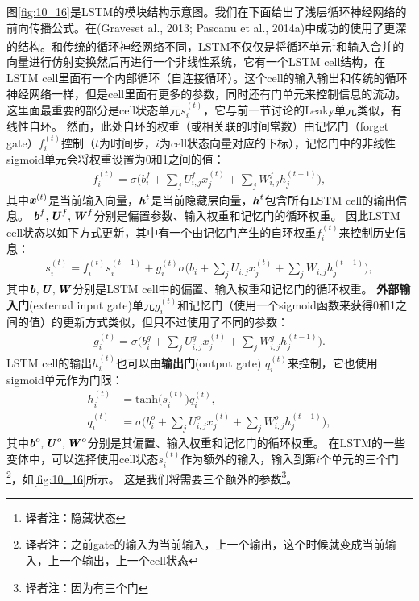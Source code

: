 图\ref{fig:10_16}是LSTM的模块结构示意图。我们在下面给出了浅层循环神经网络的前向传播公式。在(Graveset al., 2013; Pascanu et al., 2014a)中成功的使用了更深的结构。和传统的循环神经网络不同，LSTM不仅仅是将循环单元\footnote{译者注：隐藏状态}和输入合并的向量进行仿射变换然后再进行一个非线性系统，它有一个LSTM cell结构，在LSTM cell里面有一个内部循环（自连接循环）。这个cell的输入输出和传统的循环神经网络一样，但是cell里面有更多的参数，同时还有门单元来控制信息的流动。这里面最重要的部分是cell状态单元$s_i^{(t)}$，它与前一节讨论的Leaky单元类似，有线性自环。
然而，此处自环的权重（或相关联的时间常数）由记忆门（forget gate）$f_i^{(t)}$控制（$t$为时间步，$i$为cell状态向量对应的下标），记忆门中的非线性sigmoid单元会将权重设置为0和1之间的值：
\begin{align}
 f_i^{(t)} = \sigma \Big( b_i^f + \sum_j U_{i,j}^f x_j^{(t)} + \sum_j W_{i,j}^f h_j^{(t-1)} \Big),
\end{align}
其中$\boldsymbol{\mathit{x}}^{(t)}$是当前输入向量，$\boldsymbol{\mathit{h}}^{t}$是当前隐藏层向量，$\boldsymbol{\mathit{h}}^{t}$包含所有LSTM cell的输出信息。 
$\boldsymbol{\mathit{b}}^f, \boldsymbol{\mathit{U}}^f, \boldsymbol{\mathit{W}}^f$分别是偏置参数、输入权重和记忆门的循环权重。
因此LSTM cell状态以如下方式更新，其中有一个由记忆门产生的自环权重$f_i^{(t)}$来控制历史信息：
\begin{align}
 s_i^{(t)} = f_i^{(t)}  s_i^{(t-1)} +  g_i^{(t)}
 \sigma \Big( b_i + \sum_j U_{i,j} x_j^{(t)} + \sum_j W_{i,j} h_j^{(t-1)} \Big),
\end{align}
其中$\boldsymbol{\mathit{b}}, \boldsymbol{\mathit{U}}, \boldsymbol{\mathit{W}}$分别是LSTM cell中的偏置、输入权重和记忆门的循环权重。
\textbf{外部输入门}(external input gate)单元$g_i^{(t)}$和记忆门（使用一个sigmoid函数来获得0和1之间的值）的更新方式类似，但只不过使用了不同的参数：
\begin{align}
 g_i^{(t)} = \sigma \Big( b_i^g + \sum_j U_{i,j}^g x_j^{(t)} + \sum_j W_{i,j}^g h_j^{(t-1)} \Big).
\end{align}
LSTM cell的输出$h_i^{(t)}$也可以由\textbf{输出门}(output gate) $q_i^{(t)}$来控制，它也使用sigmoid单元作为门限：
\begin{align}
 h_i^{(t)} &= \text{tanh}\big( s_i^{(t)} \big) q_i^{(t)}, \\
 q_i^{(t)} &= \sigma \Big( b_i^o + \sum_j U_{i,j}^o x_j^{(t)} + \sum_j W_{i,j}^o h_j^{(t-1)} \Big),
\end{align}
其中$\boldsymbol{\mathit{b}}^o, \boldsymbol{\mathit{U}}^o, \boldsymbol{\mathit{W}}^o$分别是其偏置、输入权重和记忆门的循环权重。
在LSTM的一些变体中，可以选择使用cell状态$s_i^{(t)}$作为额外的输入，输入到第$i$个单元的三个门\footnote{译者注：之前gate的输入为当前输入，上一个输出，这个时候就变成当前输入，上一个输出，上一个cell状态}，如\ref{fig:10_16}所示。
这是我们将需要三个额外的参数\footnote{译者注：因为有三个门}。

